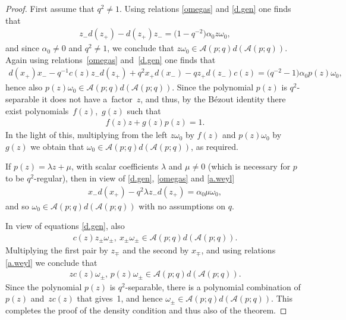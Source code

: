 \documentclass[pdftex]{sigma}
\numberwithin{equation}{section}
\def\AWeyl#1#2{{\mathcal{A}}(#1;#2)}
\begin{document}
\begin{proof}
First assume that $q^2\neq 1$. Using relations \eqref{omegas} and \eqref{d.gen} one f\/inds that
\begin{gather*}
z_-d(z_+) - d(z_+)z_- = \big(1-q^{-2}\big)\alpha_0 z\omega_0,
\end{gather*}
and since $\alpha_0 \neq 0$ and $q^2\neq 1$, we conclude that $z\omega_0 \in \AWeyl p q d (\AWeyl p q )$. Again using rela\-tions~\eqref{omegas} and~\eqref{d.gen} one f\/inds that
\begin{gather*}
d(x_+)x_- - q^{-1}c(z)z_-d(z_+) + q^2 x_+d(x_-) - qz_+ d(z_-)c(z) = \big(q^{-2}-1\big)\alpha_0 p(z)\omega_0,
\end{gather*}
hence also $p(z)\omega_0 \in \AWeyl p q d (\AWeyl p q )$. Since the polynomial $p(z)$ is $q^2$-separable it does not have a~factor~$z$, and thus, by the B\'ezout identity there exist polynomials~$f(z)$,~$g(z)$ such that
\begin{gather*}
f(z)z +g(z)p(z) = 1.
\end{gather*}
In the light of this, multiplying from the left $z\omega_0$ by $f(z)$ and $p(z)\omega_0$ by $g(z)$ we obtain that $\omega_0 \in \AWeyl p q d (\AWeyl p q )$, as required.

If $p(z)= \lambda z +\mu$, with scalar coef\/f\/icients $\lambda$ and $\mu\neq 0$ (which is necessary for $p$ to be $q^2$-regular), then in view of \eqref{d.gen}, \eqref{omegas} and \eqref{a.weyl}
\begin{gather*}
x_- d(x_+) - q^2\lambda z_-d(z_+) = \alpha_0\mu \omega_0,
\end{gather*}
and so $\omega_0 \in \AWeyl p q d (\AWeyl p q )$ with no assumptions on $q$.

In view of equations \eqref{d.gen}, also
\begin{gather*}
c(z)z_\pm \omega_\pm,\ x_\pm\omega_\pm \in \AWeyl p q d (\AWeyl p q ).
\end{gather*}
Multiplying the f\/irst pair by $z_\mp$ and the second by $x_\mp$, and using relations \eqref{a.weyl} we conclude that
\begin{gather*}
zc(z)\omega_\pm,\, p(z)\omega_\pm \in \AWeyl p q d (\AWeyl p q ).
\end{gather*}
Since the polynomial $p(z)$ is $q^2$-separable, there is a polynomial combination of~$p(z)$ and~$zc(z)$ that gives~1, and hence $\omega_\pm \in \AWeyl p q d (\AWeyl p q )$. This completes the proof of the density condition and thus also of the theorem.
\end{proof}
\end{document}
